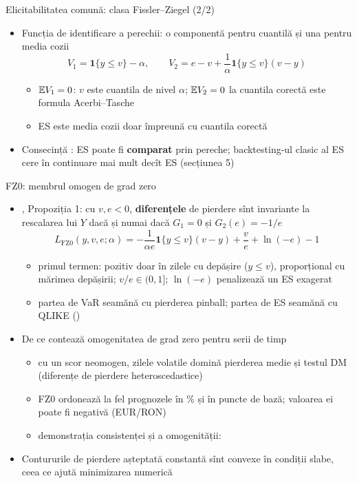 \begin{frame}{Elicitabilitatea comună: clasa Fissler--Ziegel (2/2)}
\itemsize{\small}
\begin{itemize}
    \item Funcția de identificare a perechii: o componentă pentru cuantilă și una pentru media cozii
    \[ V_1 = \mathbf 1\{y \le v\} - \alpha, \qquad V_2 = e - v + \frac{1}{\alpha}\mathbf 1\{y \le v\}(v - y) \]
    \begin{itemize}
        \item $\mathbb{E} V_1 = 0$: $v$ este cuantila de nivel $\alpha$; $\mathbb{E} V_2 = 0$ la cuantila corectă este formula Acerbi--Tasche
        \item ES este media cozii doar împreună cu cuantila corectă
    \end{itemize}
    \item Consecință : ES poate fi \textbf{comparat} prin pereche; backtesting-ul clasic al ES cere în continuare mai mult decît ES (secțiunea 5)
\end{itemize}
\end{frame}

\begin{frame}{FZ0: membrul omogen de grad zero}
\itemsize{\small}
\begin{itemize}
    \item {}, Propoziția 1: cu $v, e < 0$, \textbf{diferențele} de pierdere sînt invariante la rescalarea lui $Y$ dacă și numai dacă $G_1 = 0$ și $G_2(e) = -1/e$
    \[ L_{\mathrm{FZ0}}(y, v, e; \alpha) = -\frac{1}{\alpha e}\mathbf 1\{y \le v\}(v - y) + \frac{v}{e} + \ln(-e) - 1 \]
    \begin{itemize}
        \item primul termen: pozitiv doar în zilele cu depășire ($y \le v$), proporțional cu mărimea depășirii; $v/e \in (0, 1]$; $\ln(-e)$ penalizează un ES exagerat
        \item partea de VaR seamănă cu pierderea pinball; partea de ES seamănă cu QLIKE ()
    \end{itemize}
    \item De ce contează omogenitatea de grad zero pentru serii de timp
    \begin{itemize}
        \item cu un scor neomogen, zilele volatile domină pierderea medie și testul DM (diferențe de pierdere heteroscedastice)
        \item FZ0 ordonează la fel prognozele în \% și în puncte de bază; valoarea ei poate fi negativă (EUR/RON)
        \item demonstrația consistenței și a omogenității:   %
    \end{itemize}
    \item Contururile de pierdere așteptată constantă sînt convexe în condiții slabe, ceea ce ajută minimizarea numerică 
\end{itemize}
\end{frame}

